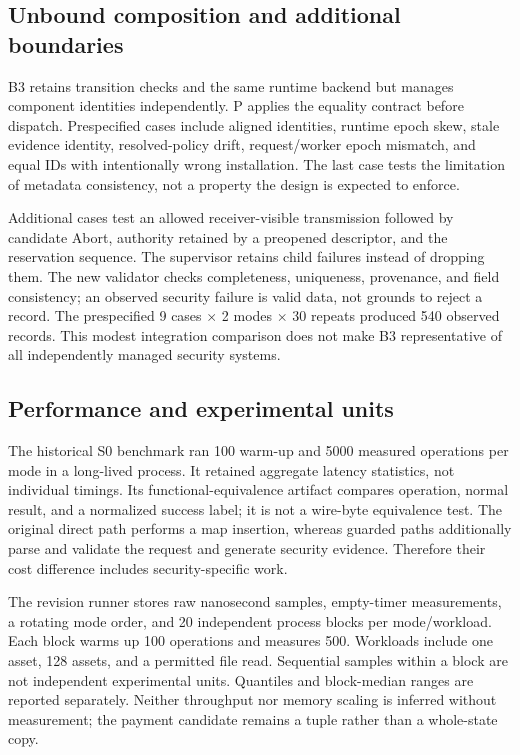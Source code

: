 \documentclass[electronics,article,submit,pdftex,moreauthors]{Definitions/mdpi}
\begin{document}
\subsection{Unbound composition and additional boundaries}
B3 retains transition checks and the same runtime backend but manages component identities independently. P applies the equality contract before dispatch. Prespecified cases include aligned identities, runtime epoch skew, stale evidence identity, resolved-policy drift, request/worker epoch mismatch, and equal IDs with intentionally wrong installation. The last case tests the limitation of metadata consistency, not a property the design is expected to enforce.

Additional cases test an allowed receiver-visible transmission followed by candidate Abort, authority retained by a preopened descriptor, and the reservation sequence. The supervisor retains child failures instead of dropping them. The new validator checks completeness, uniqueness, provenance, and field consistency; an observed security failure is valid data, not grounds to reject a record. The prespecified 9 cases $\times$ 2 modes $\times$ 30 repeats produced 540 observed records. This modest integration comparison does not make B3 representative of all independently managed security systems.

\subsection{Performance and experimental units}
The historical S0 benchmark ran 100 warm-up and 5000 measured operations per mode in a long-lived process. It retained aggregate latency statistics, not individual timings. Its functional-equivalence artifact compares operation, normal result, and a normalized success label; it is not a wire-byte equivalence test. The original direct path performs a map insertion, whereas guarded paths additionally parse and validate the request and generate security evidence. Therefore their cost difference includes security-specific work.

The revision runner stores raw nanosecond samples, empty-timer measurements, a rotating mode order, and 20 independent process blocks per mode/workload. Each block warms up 100 operations and measures 500. Workloads include one asset, 128 assets, and a permitted file read. Sequential samples within a block are not independent experimental units. Quantiles and block-median ranges are reported separately. Neither throughput nor memory scaling is inferred without measurement; the payment candidate remains a tuple rather than a whole-state copy.
\end{document}
